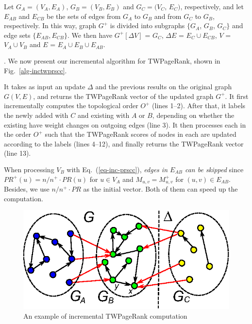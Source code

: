 Let $G_A=(V_A,E_A)$, $G_B=(V_B,E_B)$ and $G_C=(V_C$, $E_C)$, respectively, and
let $E_{AB}$ and $E_{CB}$  be the sets of edges from $G_A$ to $G_B$ and from $G_C$ to $G_B$, respectively.
In this way, graph $G^+$ is divided into subgraphs $\{G_A$, $G_B$, $G_C\}$ and edge sets $\{E_{AB}, E_{CB}\}$.
%
We then have $G^+[\Delta V]$ = $G_C$, $\Delta E$ = $E_C\cup E_{CB}$, $V$ = $V_A\cup V_B$ and $E$ = $E_A\cup E_B\cup E_{AB}$.



. We now present our incremental algorithm for TWPageRank, shown in Fig.~\ref{alg-inctwprscc}.


It takes as input an update $\Delta$ and the previous results on the original graph $G(V, E)$, and returns the TWPageRank vector of the updated graph $G^+$. It first incrementally computes the topological order $O^+$
(lines 1--2). %
%
After that, it labels the newly added \sccs with $C$ and existing \sccs with $A$ or $B$, depending on whether the existing \sccs have weight changes on outgoing edges (line 3).
%
It then processes each \scc in the order $O^+$ such that the TWPageRank scores of nodes in each \scc are updated according to the labels (lines 4--12), and finally returns the TWPageRank vector (line 13).
%
%

When processing $V_B$ with Eq.~(\ref{eq-inc-prscc}), {\em edges in $E_{AB}$ can be skipped}  since $PR^+(u)={n}/{n^+}\cdot PR(u)$ for $u\in V_A$ and $M_{u,v}=M^+_{u,v}$ for $(u,v)\in E_{AB}$. Besides, we use ${n}/{n^+}\cdot PR$ as the initial vector. Both of them can speed up the computation.


\begin{figure}[tb!]
\centering
\includegraphics[scale=0.7]{fig/General_framework_peak.eps}
\vspace{-1ex}
\caption{\small An example of incremental TWPageRank computation}
\label{fig-inc-division}
\vspace{-3ex}
\end{figure}


